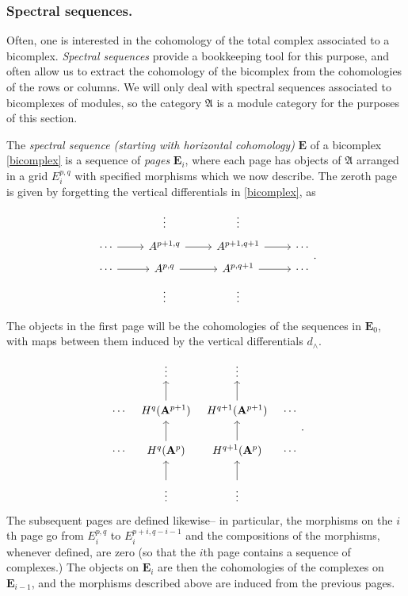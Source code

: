 \documentclass[a4paper]{article}
\theoremstyle{definition}
\theoremstyle{remark}
\begin{document}
\subsubsection{Spectral sequences.} 
Often, one is interested in the cohomology of the total complex associated to
a bicomplex. \textit{Spectral sequences} provide a bookkeeping tool for this
purpose, and often allow us to extract the cohomology of the bicomplex from the
cohomologies of the rows or columns. We will only deal with spectral sequences
associated to bicomplexes of modules, so the category \(\mathfrak{A}\) is a
module category for the purposes of this section.

The \textit{spectral sequence (starting with horizontal cohomology)}
\(\mathbf{E}\) of a bicomplex \eqref{bicomplex} is a sequence of \textit{pages}
\(\mathbf{E}_i\), where each page has objects of \(\mathfrak{A}\) arranged in a
grid \(E^{p,q}_i\) with specified morphisms which we now describe. The zeroth
page is given by forgetting the vertical differentials in \eqref{bicomplex}, as
\[\begin{tikzcd}[row sep=tiny]
    & \vdots & \vdots & \\
    \cdots \arrow[r] & A^{p+1,q} \arrow[r] & A^{p+1,q+1} \arrow[r] &\cdots \\
    \cdots \arrow[r] & A^{p,q} \arrow[r] & A^{p,q+1} \arrow[r] &\cdots  \\
    & \vdots & \vdots & \\
\end{tikzcd}.\]
The objects in the first page will be the cohomologies of the sequences in
\(\mathbf{E}_0\), with maps between them induced by the vertical differentials
\(d_\wedge\).
\[\begin{tikzcd}[column sep = tiny] 
    &\vdots &\vdots & \\
    \cdots & H^q(\mathbf{A}^{p+1}) \arrow[u] &   H^{q+1}(\mathbf{A}^{p+1}) \arrow[u]
           & \cdots \\
    \cdots & H^q(\mathbf{A}^{p}) \arrow[u] &   H^{q+1}(\mathbf{A}^{p}) \arrow[u]
           & \cdots \\
           &\vdots\arrow[u] &\vdots\arrow[u] & 
\end{tikzcd}.\]
The subsequent pages are defined likewise-- in particular, the morphisms on the
\(i\)th page go from \(E_i^{p,q}\) to \(E_i^{p+i,q-i-1}\) and the compositions
of the morphisms, whenever defined, are zero (so that the \(i\)th page contains a
sequence of complexes.) The objects on \(\mathbf{E}_i\) are then the
cohomologies of the complexes on \(\mathbf{E}_{i-1}\), and the morphisms described
above are induced from the previous pages. 
\end{document}
